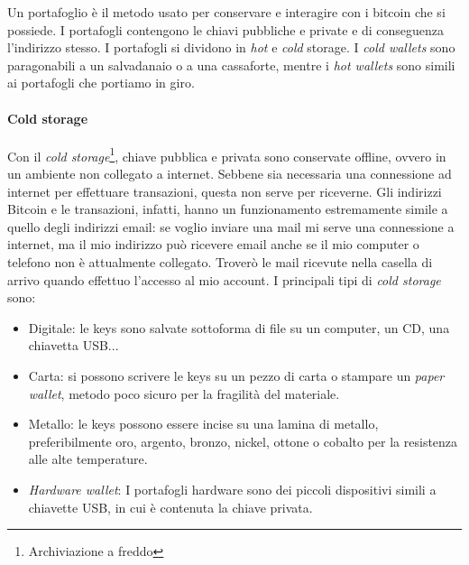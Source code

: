 \documentclass {article}
\begin{document}
Un portafoglio è il metodo usato per conservare e interagire con i bitcoin che si possiede.
I portafogli contengono le chiavi pubbliche e private e di conseguenza l'indirizzo stesso.
I portafogli si dividono in \textit{hot} e \textit{cold} storage.
I \textit{cold wallets} sono paragonabili a un salvadanaio o a una cassaforte, mentre i \textit{hot wallets} sono simili ai portafogli che portiamo in giro.

\paragraph {Cold storage}

Con il \textit{cold storage}\footnote{Archiviazione a freddo}, chiave pubblica e privata sono conservate offline, ovvero in un ambiente non collegato a internet.
Sebbene sia necessaria una connessione ad internet per effettuare transazioni, questa non serve per riceverne.
Gli indirizzi Bitcoin e le transazioni, infatti, hanno un funzionamento estremamente simile a quello degli indirizzi email: se voglio inviare una mail mi serve una connessione a internet, ma il mio indirizzo può ricevere email anche se il mio computer o telefono non è attualmente collegato.
Troverò le mail ricevute nella casella di arrivo quando effettuo l'accesso al mio account.
I principali tipi di \textit{cold storage} sono:

\begin{itemize}
\item Digitale: le keys sono salvate sottoforma di file su un computer, un CD, una chiavetta USB...
\item Carta: si possono scrivere le keys su un pezzo di carta o stampare un \textit{paper wallet}, metodo poco sicuro per la fragilità del materiale.
\item Metallo: le keys possono essere incise su una lamina di metallo, preferibilmente oro, argento, bronzo, nickel, ottone o cobalto per la resistenza alle alte temperature.
\item \textit{Hardware wallet}: I portafogli hardware sono dei piccoli dispositivi simili a chiavette USB, in cui è contenuta la chiave privata.
\end{itemize}
\end{document}
